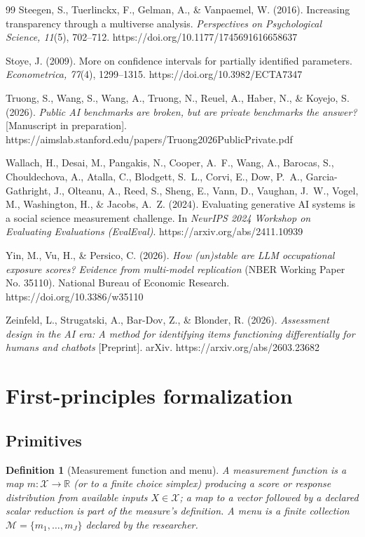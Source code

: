 \documentclass[10pt,letterpaper]{article}
\newtheorem{definition}{Definition}[section]
\newcommand{\M}{\ensuremath{\mathcal{M}}}
\begin{document}
\begin{thebibliography}{99}
 Steegen, S., Tuerlinckx, F., Gelman, A., \& Vanpaemel, W. (2016). Increasing transparency through a multiverse analysis. \textit{Perspectives on Psychological Science, 11}(5), 702--712. https://doi.org/10.1177/1745691616658637

 Stoye, J. (2009). More on confidence intervals for partially identified parameters. \textit{Econometrica, 77}(4), 1299--1315. https://doi.org/10.3982/ECTA7347

 Truong, S., Wang, S., Wang, A., Truong, N., Reuel, A., Haber, N., \& Koyejo, S. (2026). \textit{Public AI benchmarks are broken, but are private benchmarks the answer?} [Manuscript in preparation]. https://aimslab.stanford.edu/papers/Truong2026PublicPrivate.pdf

 Wallach, H., Desai, M., Pangakis, N., Cooper, A.~F., Wang, A., Barocas, S., Chouldechova, A., Atalla, C., Blodgett, S.~L., Corvi, E., Dow, P.~A., Garcia-Gathright, J., Olteanu, A., Reed, S., Sheng, E., Vann, D., Vaughan, J.~W., Vogel, M., Washington, H., \& Jacobs, A.~Z. (2024). Evaluating generative AI systems is a social science measurement challenge. In \textit{NeurIPS 2024 Workshop on Evaluating Evaluations (EvalEval)}. https://arxiv.org/abs/2411.10939

 Yin, M., Vu, H., \& Persico, C. (2026). \textit{How (un)stable are LLM occupational exposure scores? Evidence from multi-model replication} (NBER Working Paper No. 35110). National Bureau of Economic Research. https://doi.org/10.3386/w35110

 Zeinfeld, L., Strugatski, A., Bar-Dov, Z., \& Blonder, R. (2026). \textit{Assessment design in the AI era: A method for identifying items functioning differentially for humans and chatbots} [Preprint]. arXiv. https://arxiv.org/abs/2603.23682

\end{thebibliography}

\clearpage
\appendix

\section{First-principles formalization}
\label{app:formal}

\subsection{Primitives}
\begin{definition}[Measurement function and menu]
A \emph{measurement function} is a map $m:\mathcal{X}\to\mathbb{R}$ (or to a finite choice simplex) producing a score or response distribution from available inputs $X\in\mathcal{X}$; a map to a vector followed by a \emph{declared} scalar reduction is part of the measure's definition.
A \emph{menu} is a finite collection $\M=\{m_1,\ldots,m_J\}$ declared by the researcher.
\end{definition}
\end{document}

